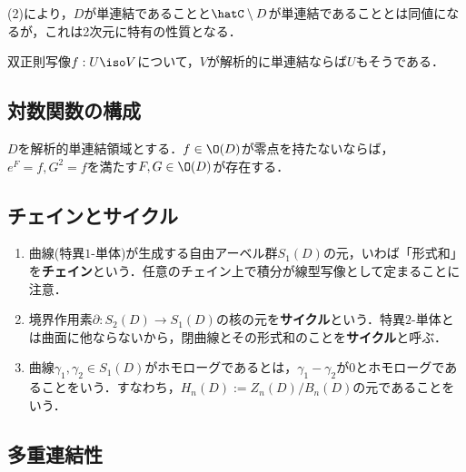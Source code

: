 \documentclass[uplatex, dvipdfmx]{jsreport}
\begin{document}
\begin{remark}
    (2)により，$D$が単連結であることと$\hatC\setminus D$が単連結であることとは同値になるが，これは2次元に特有の性質となる．
\end{remark}

\begin{proposition}[単連結性の遺伝]
    双正則写像$f:U\iso V$について，$V$が解析的に単連結ならば$U$もそうである．
\end{proposition}



\subsection{対数関数の構成}

\begin{lemma}
    $D$を解析的単連結領域とする．$f\in\O(D)$が零点を持たないならば，$e^F=f,G^2=f$を満たす$F,G\in\O(D)$が存在する．
\end{lemma}

\subsection{チェインとサイクル}

\begin{definition}\mbox{}
    \begin{enumerate}
        \item 曲線(特異$1$-単体)が生成する自由アーベル群$S_1(D)$の元，いわば「形式和」を\textbf{チェイン}という．任意のチェイン上で積分が線型写像として定まることに注意．
        \item 境界作用素$\partial:S_{2}(D)\to S_1(D)$の核の元を\textbf{サイクル}という．特異$2$-単体とは曲面に他ならないから，閉曲線とその形式和のことを\textbf{サイクル}と呼ぶ．
        \item 曲線$\gamma_1,\gamma_2\in S_1(D)$がホモローグであるとは，$\gamma_1-\gamma_2$が$0$とホモローグであることをいう．すなわち，$H_n(D):=Z_n(D)/B_n(D)$の元であることをいう．
    \end{enumerate}
\end{definition}

\subsection{多重連結性}
\end{document}
